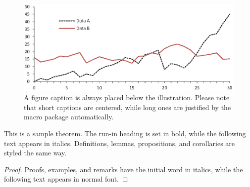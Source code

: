 \documentclass[runningheads]{llncs}
\begin{document}
\begin{figure}
\includegraphics[width=\textwidth]{fig1.eps}
\caption{A figure caption is always placed below the illustration.
Please note that short captions are centered, while long ones are
justified by the macro package automatically.} \label{fig1}
\end{figure}

\begin{theorem}
This is a sample theorem. The run-in heading is set in bold, while
the following text appears in italics. Definitions, lemmas,
propositions, and corollaries are styled the same way.
\end{theorem}
%
%
\begin{proof}
Proofs, examples, and remarks have the initial word in italics,
while the following text appears in normal font.
\end{proof}

%
%



\end{document}
